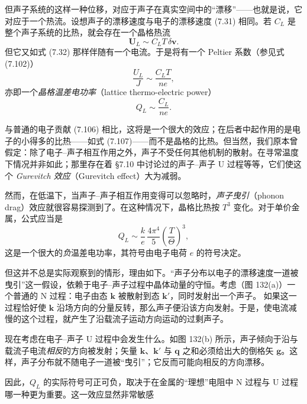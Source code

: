 但声子系统的这样一种位移，对应于声子在真实空间中的“漂移”——也就是说，它对应于一个热流。设想声子的漂移速度与电子的漂移速度 (7.31) 相同。若 $C_{L}$ 是整个声子系统的比热，就会存在一个晶格热流
\begin{equation*}
\mathbf{U}_{L}\sim C_{L}T\,\delta\mathbf{v}.\tag{7.133}
\end{equation*}
但它又如式 (7.32) 那样伴随有一个电流。于是将有一个 Peltier 系数（参见式 (7.102)）
\begin{equation*}
\frac{U_{L}}{J}\sim\frac{C_{L}T}{ne},\tag{7.134}
\end{equation*}
亦即一个\emph{晶格温差电功率}（lattice thermo-electric power）
\begin{equation*}
Q_{L}\sim\frac{C_{L}}{ne}.\tag{7.135}
\end{equation*}

与普通的电子贡献 (7.106) 相比，这将是一个很大的效应；在后者中起作用的是电子的小得多的比热——如式 (7.107)——而不是晶格的比热。但当然，我们原本曾假定：除了电子--声子相互作用之外，声子不受任何其他机制的散射。在寻常温度下情况并非如此；那里存在着 §7.10 中讨论过的声子--声子 U 过程等等，它们使这个 \emph{Gurevitch 效应}（Gurevitch effect）大为减弱。

然而，在低温下，当声子--声子相互作用变得可以忽略时，\emph{声子曳引}（phonon drag）效应就很容易探测到了。在这种情况下，晶格比热按 $T^{3}$ 变化。对于单价金属，公式应当是
\begin{equation*}
Q_{L}\sim\frac{k}{e}\,\frac{4\pi^{4}}{5}\left(\frac{T}{\Theta}\right)^{3},\tag{7.136}
\end{equation*}
这是一个很大的\emph{负}温差电功率，其符号由电子电荷 $e$ 的符号决定。

但这并不总是实际观察到的情形，理由如下。“声子分布以电子的漂移速度一道被曳引”这一假设，依赖于电子--声子过程中晶体动量的守恒。考虑（图 132(a)）一个普通的 N 过程：电子由态 $\mathbf{k}$ 被散射到态 $\mathbf{k}'$，同时发射出一个声子。
如果这一过程恰好使 $\mathbf{k}$ 沿场方向的分量反转，那么声子便沿该方向发射。于是，使电流减慢的这个过程，就产生了沿载流子运动方向运动的过剩声子。

现在考虑在电子--声子 U 过程中会发生什么。如图 132(b) 所示，声子倾向于沿与载流子电流\emph{相反}的方向被发射；矢量 $\mathbf{k}$、$\mathbf{k}'$ 与 $\mathbf{q}$ 之和必须给出大的倒格矢 $\mathbf{g}$。这样，声子分布就不随电子一道被“曳引”；它反而可能向相反的方向漂移。

因此，$Q_{L}$ 的实际符号可正可负，取决于在金属的“理想”电阻中 N 过程与 U 过程哪一种更为重要。这一效应显然非常敏感
